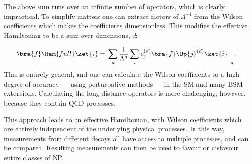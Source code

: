 The above sum runs over an infinite number of operators, which is clearly impractical.
To simplify matters one can extract factors of $\Lambda^{-1}$ from the Wilson coefficients which
makes the coefficients dimensionless.
This modifies the effective Hamiltonian to be a sum over dimensions, $d$:
\begin{equation}
  \bra{f}\Ham{full}\ket{i} =
  \left.\sum_{d}\frac{1}{\Lambda^{d}}
  \sum_i c_j^{(d)}\bra{f}\Op{j}^{(d)}\ket{i}\right|_{\Lambda}.
\end{equation}
This is entirely general, and one can calculate the Wilson coefficients to a high degree of
accuracy --- using perturbative methods --- in the SM and many BSM extensions.
Calculating the long distance operators is more challenging, however, because they contain QCD
processes.

This approach leads to an effective Hamiltonian, with Wilson coefficients which are entirely
independent of the underlying physical processes.
In this way, measurements from different decays all have access to multiple processes, and can be
compared.
Resulting measurements can then be used to favour or disfavour entire classes of NP.






